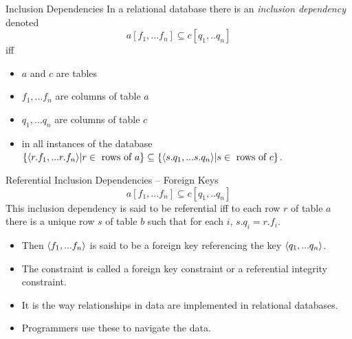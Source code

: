 \newcommand{\incdsetup}{$
\begin{array}{c p{0.5cm} c p{0.5cm} c}
             &&\Rnode{bi}{b_i} &&              \\[0.5cm]
\Rnode{a}{a} &&                && \Rnode{c}{c}
\end{array}
\begin{arrows}
\ncarr{a}{bi}\alabel{f_i}
\ncarr{c}{bi}\blabel{q_i}
\end{arrows}
$}

\newcommand{\incdresolution}{$
\begin{array}{c p{0.5cm} c p{0.5cm} c}
             &&\Rnode{bi}{D(b_i)} &&              \\[0.5cm]
\Rnode{a}{D(a)} &&                && \Rnode{c}{D(c)}
\end{array}
\begin{arrows}
\ncarr{a}{bi}\alabel{D(f_i)}
\ncarr{c}{bi}\blabel{D(q_i)}
\ncarr{a}{c}\blabel{J_D}
\end{arrows}
$}

\begin{frame}{Inclusion Dependencies}
In a relational database there is an \textit{inclusion dependency} denoted
$$a[f_1,...f_n] \subseteq c[q_1,..q_n]$$ 
iff
\begin{itemize}
\item $a$ and $c$ are tables
\item $f_1,...f_n$ are columns of table $a$
\item $q_1,...q_n$ are columns of table $c$
\item in all instances of the database
       $\{\langle r.f_1,...r.f_n\rangle | r \in \mbox{ rows of } a\} \subseteq \{\langle s.q_1,...s.q_n\rangle | s \in \mbox{ rows of } c\}$.
\end{itemize}
\end{frame}

\begin{frame}{Referential Inclusion Dependencies -- Foreign Keys}
$$a[f_1,...f_n] \subseteq c[q_1,..q_n]$$ 
This inclusion dependency is said to be referential iff to each row $r$ of table $a$ there is a unique row $s$ of table $b$
such that for each $i$, $s.q_i=r.f_i$.
\pause
\begin{itemize}
    \item Then $\langle f_1,...f_n\rangle$ is said to be a foreign key referencing the key $\langle q_1,...q_n\rangle$.
    \item The constraint is called a foreign key constraint or a referential integrity constraint.
    \item It is the way relationships in data are implemented in relational databases.
    \item Programmers use these to navigate the data.
\end{itemize}
\end{frame}


